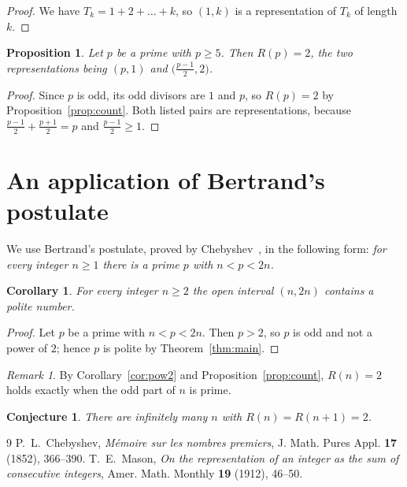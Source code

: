 \documentclass[11pt]{amsart}
\newtheorem{proposition}[theorem]{Proposition}
\newtheorem{corollary}[theorem]{Corollary}
\newtheorem{conjecture}[theorem]{Conjecture}
\theoremstyle{definition}
\theoremstyle{remark}
\newtheorem*{remark}{Remark}
\begin{document}
\begin{proof}
We have $T_k=1+2+\dots+k$, so $(1,k)$ is a representation of $T_k$ of
length $k$.
\end{proof}

\begin{proposition}\label{prop:prime}
Let $p$ be a prime with $p\ge 5$. Then $R(p)=2$, the two representations
being $(p,1)$ and $\bigl(\frac{p-1}{2},2\bigr)$.
\end{proposition}

\begin{proof}
Since $p$ is odd, its odd divisors are $1$ and $p$, so $R(p)=2$ by
Proposition~\ref{prop:count}. Both listed pairs are representations, because
$\frac{p-1}{2}+\frac{p+1}{2}=p$ and $\frac{p-1}{2}\ge 1$.
\end{proof}

\section{An application of Bertrand's postulate}\label{sec:apps}

We use Bertrand's postulate, proved by Chebyshev~\cite{Che}, in the following
form: \emph{for every integer $n\ge 1$ there is a prime $p$ with $n<p<2n$.}

\begin{corollary}\label{cor:interval}
For every integer $n\ge 2$ the open interval $(n,2n)$ contains a polite
number.
\end{corollary}

\begin{proof}
Let $p$ be a prime with $n<p<2n$. Then $p>2$, so $p$ is odd and not a power of
$2$; hence $p$ is polite by Theorem~\ref{thm:main}.
\end{proof}

\begin{remark}
By Corollary~\ref{cor:pow2} and Proposition~\ref{prop:count}, $R(n)=2$ holds
exactly when the odd part of $n$ is prime.
\end{remark}

\begin{conjecture}\label{conj:pairs}
There are infinitely many $n$ with $R(n)=R(n+1)=2$.
\end{conjecture}

\begin{thebibliography}{9}
 P.~L.~Chebyshev, \emph{M\'emoire sur les nombres premiers},
J. Math. Pures Appl. \textbf{17} (1852), 366--390.
 T.~E.~Mason, \emph{On the representation of an integer as the sum
of consecutive integers}, Amer. Math. Monthly \textbf{19} (1912), 46--50.
\end{thebibliography}
\end{document}
